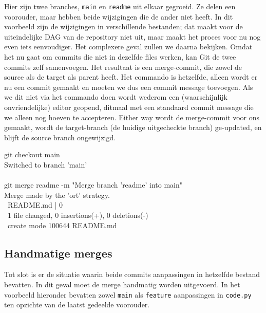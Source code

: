 Hier zijn twee branches, \texttt{main} en \texttt{readme} uit elkaar gegroeid. Ze delen een voorouder, maar hebben beide wijzigingen die de ander niet heeft. In dit voorbeeld zijn de wijzigingen in verschillende bestanden; dat maakt voor de uiteindelijke DAG van de repository niet uit, maar maakt het proces voor nu nog even iets eenvoudiger. Het complexere geval zullen we daarna bekijken. Omdat het nu gaat om commits die niet in dezelfde files werken, kan Git de twee commits zelf samenvoegen. Het resultaat is een merge-commit, die zowel de source als de target als parent heeft. Het commando is hetzelfde, alleen wordt er nu een commit gemaakt en moeten we dus een commit message toevoegen. Als we dit niet via het commando doen wordt wederom een (waarschijnlijk onvriendelijke) editor geopend, ditmaal met een standaard commit message die we alleen nog hoeven te accepteren. Either way wordt de merge-commit voor ons gemaakt, wordt de target-branch (de huidige uitgecheckte branch) ge-updated, en blijft de source branch ongewijzigd.

\begin{bash}
 git checkout main\\
Switched to branch 'main' \\
~ \\
 git merge readme -m "Merge branch 'readme' into main" \\
Merge made by the 'ort' strategy. \\
\ README.md | 0 \\
\ 1 file changed, 0 insertions(+), 0 deletions(-) \\
\ create mode 100644 README.md \\
\end{bash}

\subsection{Handmatige merges}
Tot slot is er de situatie waarin beide commits aanpassingen in hetzelfde bestand bevatten. In dit geval moet de merge handmatig worden uitgevoerd. In het voorbeeld hieronder bevatten zowel \texttt{main} als \texttt{feature} aanpassingen in \texttt{code.py} ten opzichte van de laatst gedeelde voorouder.

